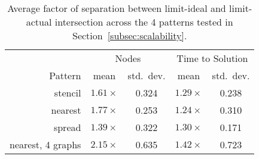 \begin{table}[t]
\centering
\small
\begin{tabular}{r | c | c | c | c}
        & \multicolumn{2}{|c|}{Nodes} & \multicolumn{2}{|c}{Time to Solution} \\
Pattern & mean & std.~dev. & mean & std.~dev. \\
\hline
stencil & $1.61\times$ & 0.324 & $1.29\times$ & 0.238 \\
nearest & $1.77\times$ & 0.253 & $1.24\times$ & 0.310 \\
spread  & $1.39\times$ & 0.322 & $1.30\times$ & 0.171 \\
nearest, 4 graphs & $2.15\times$ & 0.635 & $1.42\times$ & 0.723
\end{tabular}

\vspace{-0.20cm}
\caption{Average factor of separation between limit-ideal and limit-actual intersection across the 4 patterns tested in Section~\ref{subsec:scalability}.\label{tab:metg-predict-strong}}
\vspace{-0.5cm}
\end{table}
